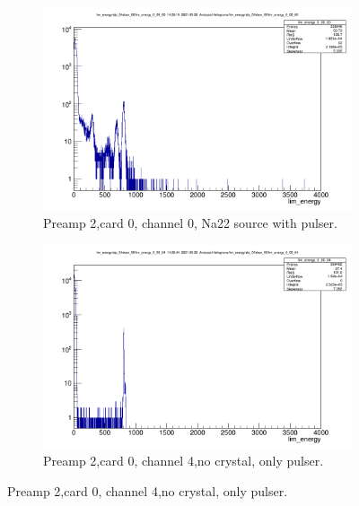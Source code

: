 \documentclass{report}
\begin{document}
\begin{figure}[!htb]
  \centering
  \begin{subfigure}[b]{0.45\textwidth}
    \includegraphics[width=\linewidth]{preamp2_lim_energy_card0_ch0.png}
    \caption{Preamp 2,card 0, channel 0, Na22 source with pulser.}
  \end{subfigure}
  \begin{subfigure}[b]{0.45\textwidth}
    \includegraphics[width=\linewidth]{preamp2_lim_energy_card0_ch4_no_crystal.png}
    \caption{Preamp 2,card 0, channel 4,no crystal, only pulser.}
  \end{subfigure}
\end{figure}
\end{document}
